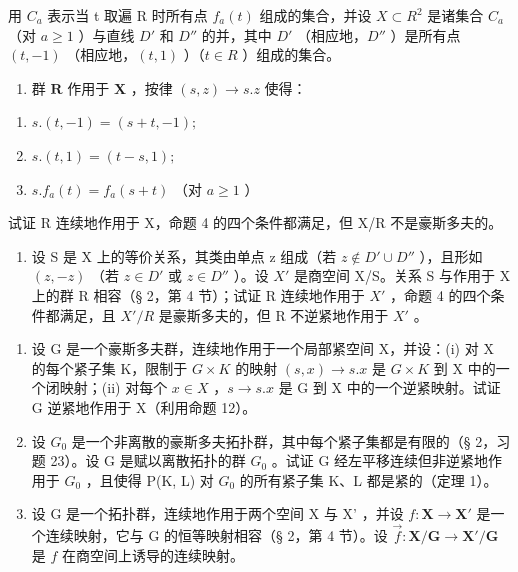 用 \(C_{a}\) 表示当 t 取遍 R 时所有点 \(f_{a}(t)\) 组成的集合，并设 \(X \subset R^{2}\) 是诸集合 \(C_{a}\) （对 \(a \geqslant 1\) ）与直线 \(D'\) 和 \(D''\) 的并，其中 \(D'\) （相应地，\(D''\) ）是所有点 \((t, -1)\) （相应地，\((t, 1)\) ）（\(t \in R\) ）组成的集合。

\begin{enumerate}
\def\labelenumi{\alph{enumi})}
\tightlist
\item
  群 \(\mathbf{R}\) 作用于 \(\mathbf{X}\) ，按律 \((s, z) \to s.z\) 使得：
\end{enumerate}

\begin{enumerate}
\def\labelenumi{(\roman{enumi})}
\item
  \(s.(t, -1) = (s + t, -1);\)
\item
  \(s.(t,1) = (t - s,1);\)
\item
  \(s.f_{a}(t) = f_{a}(s + t)\) （对 \(a\geqslant 1\) ）
\end{enumerate}

试证 R 连续地作用于 X，命题 4 的四个条件都满足，但 X/R 不是豪斯多夫的。

\begin{enumerate}
\def\labelenumi{\alph{enumi})}
\setcounter{enumi}{1}
\tightlist
\item
  设 S 是 X 上的等价关系，其类由单点 z 组成（若 \(z \notin D' \cup D''\) ），且形如 \((z, -z)\) （若 \(z \in D'\) 或 \(z \in D''\) ）。设 \(X'\) 是商空间 X/S。关系 S 与作用于 X 上的群 R 相容（§ 2，第 4 节）；试证 R 连续地作用于 \(X'\) ，命题 4 的四个条件都满足，且 \(X'/R\) 是豪斯多夫的，但 R 不逆紧地作用于 \(X'\) 。
\end{enumerate}

\begin{enumerate}
\def\labelenumi{\arabic{enumi})}
\setcounter{enumi}{6}
\item
  设 G 是一个豪斯多夫群，连续地作用于一个局部紧空间 X，并设：(i) 对 X 的每个紧子集 K，限制于 \(G \times K\) 的映射 \((s, x) \to s.x\) 是 \(G \times K\) 到 X 中的一个闭映射；(ii) 对每个 \(x \in X\) ，\(s \to s.x\) 是 G 到 X 中的一个逆紧映射。试证 G 逆紧地作用于 X（利用命题 12）。
\item
  设 \(G_{0}\) 是一个非离散的豪斯多夫拓扑群，其中每个紧子集都是有限的（§ 2，习题 23）。设 G 是赋以离散拓扑的群 \(G_{0}\) 。试证 G 经左平移连续但非逆紧地作用于 \(G_{0}\) ，且使得 P(K, L) 对 \(G_{0}\) 的所有紧子集 K、L 都是紧的（定理 1）。
\item
  设 G 是一个拓扑群，连续地作用于两个空间 X 与 X' ，并设 \(f: \mathbf{X} \to \mathbf{X}'\) 是一个连续映射，它与 G 的恒等映射相容（§ 2，第 4 节）。设 \(\vec{f}: \mathbf{X}/\mathbf{G} \to \mathbf{X}'/\mathbf{G}\) 是 \(f\) 在商空间上诱导的连续映射。
\end{enumerate}

